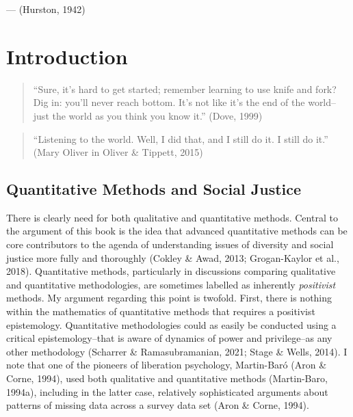 \documentclass[
  letterpaper,
  DIV=11,
  numbers=noendperiod]{scrreprt}
\begin{document}
--- (Hurston, 1942)


\chapter{Introduction}\label{introduction}

\begin{quote}
``Sure, it's hard to get started; remember learning to use knife and
fork? Dig in: you'll never reach bottom. It's not like it's the end of
the world--just the world as you think you know it.'' (Dove, 1999)
\end{quote}

\begin{quote}
``Listening to the world. Well, I did that, and I still do it. I still
do it.'' (Mary Oliver in Oliver \& Tippett, 2015)
\end{quote}

\section{Quantitative Methods and Social
Justice}\label{sec-socialjustice}

There is clearly need for both qualitative and quantitative methods.
 Central to the argument of
this book is the idea that advanced quantitative methods can be core
contributors to the agenda of understanding issues of diversity and
social justice more fully and thoroughly (Cokley \& Awad, 2013;
Grogan-Kaylor et al., 2018). Quantitative methods, particularly in
discussions comparing qualitative and quantitative methodologies, are
sometimes labelled as inherently \emph{positivist} methods.
 My argument regarding this point is twofold. First,
there is nothing within the mathematics of quantitative methods that
requires a positivist epistemology. Quantitative methodologies could as
easily be conducted using a critical epistemology--that is aware of
dynamics of power and privilege--as any other methodology (Scharrer \&
Ramasubramanian, 2021; Stage \& Wells, 2014).
  I note
that one of the pioneers of liberation psychology, Martin-Baró (Aron \&
Corne, 1994), used both qualitative and quantitative methods
(Martin-Baro, 1994a), including in the latter case, relatively
sophisticated arguments about patterns of missing data across a survey
data set (Aron \& Corne, 1994). 
\end{document}
